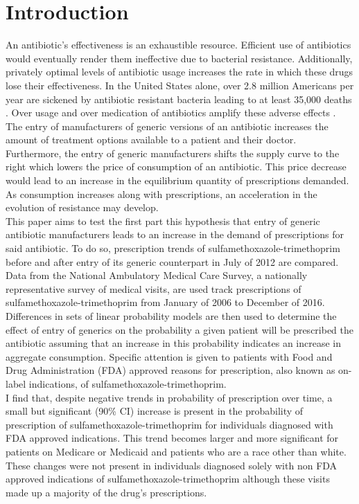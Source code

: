 \chapter{Introduction}
An antibiotic's effectiveness is an exhaustible resource. Efficient use of antibiotics would eventually render them ineffective due to bacterial resistance. Additionally, privately optimal levels of antibiotic usage increases the rate in which these drugs lose their effectiveness. In the United States alone, over 2.8 million Americans per year are sickened by antibiotic resistant bacteria leading to at least 35,000 deaths \cite{centers_for_disease_control_and_prevention_us_antibiotic_2019}. Over usage and over medication of antibiotics amplify these adverse effects \cite{gerber_outpatient_2019}.\\
\indent The entry of manufacturers of generic versions of an antibiotic increases the amount of treatment options available to a patient and their doctor. Furthermore, the entry of generic manufacturers shifts the supply curve to the right which lowers the price of consumption of an antibiotic. This price decrease would lead to an increase in the equilibrium quantity of prescriptions demanded. As consumption increases along with prescriptions, an acceleration in the evolution of resistance may develop.\\
\indent This paper aims to test the first part this hypothesis that entry of generic antibiotic manufacturers leads to an increase in the demand of prescriptions for said antibiotic. To do so, prescription trends of sulfamethoxazole-trimethoprim before and after entry of its generic counterpart in July of 2012 are compared. Data from the National Ambulatory Medical Care Survey, a nationally representative survey of medical visits, are used track prescriptions of sulfamethoxazole-trimethoprim from January of 2006 to December of 2016. Differences in sets of linear probability models are then used to determine the effect of entry of generics on the probability a given patient will be prescribed the antibiotic assuming that an increase in this probability indicates an increase in aggregate consumption. Specific attention is given to patients with Food and Drug Administration (FDA) approved reasons for prescription, also known as on-label indications, of sulfamethoxazole-trimethoprim.\\
\indent I find that, despite negative trends in probability of prescription over time, a small but significant (90\% CI) increase is present in the probability of prescription of sulfamethoxazole-trimethoprim for individuals diagnosed with FDA approved indications. This trend becomes larger and more significant for patients on Medicare or Medicaid and patients who are a race other than white. These changes were not present in individuals diagnosed solely with non FDA approved indications of sulfamethoxazole-trimethoprim although these visits made up a majority of the drug's prescriptions.\\
